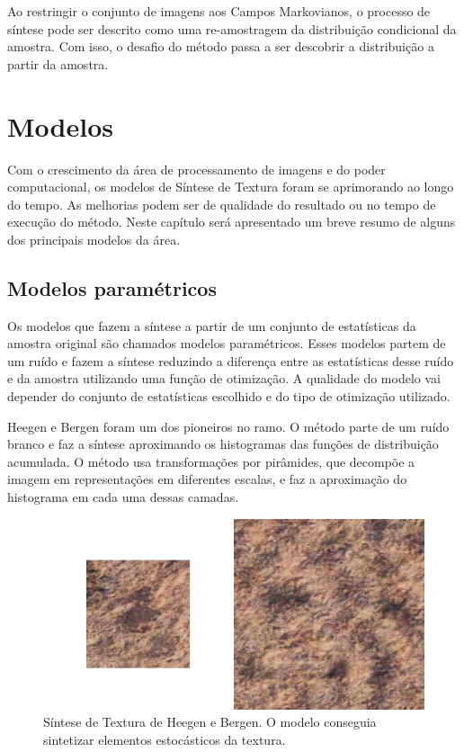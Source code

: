 
Ao restringir o conjunto de imagens aos
Campos Markovianos, o processo de síntese
pode ser descrito como uma re-amostragem
da distribuição condicional da amostra.
Com isso, o desafio do método passa a ser 
descobrir a distribuição a partir
da amostra.


\chapter{Modelos}

Com o crescimento da área de processamento
de imagens e do poder computacional,
os modelos de Síntese de Textura foram
se aprimorando ao longo do tempo.
As melhorias podem ser de qualidade
do resultado ou no tempo de 
execução do método. Neste capítulo
será apresentado um breve resumo de
alguns dos principais modelos
da área.



\section{Modelos paramétricos}

Os modelos que fazem a síntese a partir
de um conjunto de estatísticas da amostra
original são chamados modelos paramétricos.
Esses modelos partem de um ruído e fazem
a síntese reduzindo
a diferença entre as estatísticas desse
ruído e da amostra utilizando uma função de 
otimização.
A qualidade do modelo vai depender do
conjunto de estatísticas escolhido
e do tipo de otimização utilizado.


Heegen e Bergen \cite{Heeger1995} foram
um dos pioneiros no ramo. O método
parte de um ruído branco e faz a síntese
aproximando os histogramas das funções
de distribuição acumulada.
O método usa transformações
por pirâmides, que decompõe a imagem
em representações em diferentes escalas,
e faz a aproximação do histograma
em cada uma dessas camadas.

\begin{figure}[!ht]
	\centering
	\includegraphics[width=\linewidth*2/3]{files/assets/articles/bergen.png}
	\caption{Síntese de Textura de Heegen e Bergen. O modelo
	conseguia sintetizar elementos estocásticos da textura.}
	\label{img:preview}
\end{figure}

